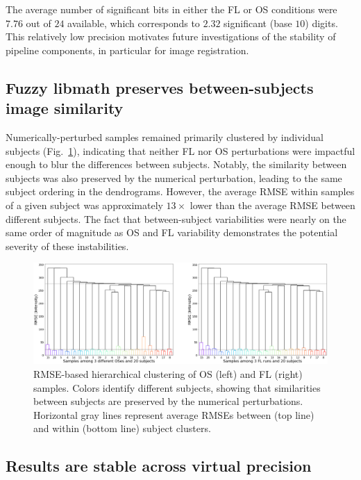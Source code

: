The average number of significant bits in either the FL or OS conditions
were $7.76$ out of $24$ available, which corresponds to $2.32$ significant (base $10$) digits.
This relatively low precision motivates future investigations of the
stability of pipeline components, in particular for image registration.

\subsection{Fuzzy libmath preserves between-subjects image similarity}

Numerically-perturbed samples remained primarily clustered by individual subjects
(Fig.~\ref{fig:clusters}), indicating that neither FL nor OS perturbations were
impactful enough to blur the differences between subjects.  Notably, the similarity between subjects was
also preserved by the numerical perturbation, leading to the same subject
ordering in the dendrograms. However, the average
RMSE within samples of a given subject was approximately $13 \times$
lower than the average RMSE between different subjects. The fact that between-subject variabilities
were nearly on the same order of magnitude as OS and FL variability demonstrates
the potential severity of these instabilities.

\begin{figure}
  \centering
  \includegraphics[width=\columnwidth]{chapters/chapter2/figures/Hclustering.png}
  \caption{RMSE-based hierarchical clustering of OS (left) and FL
    (right) samples. Colors identify different subjects, showing that
    similarities between subjects are preserved by the numerical perturbations. Horizontal gray lines
    represent average RMSEs between (top line) and within (bottom line) subject clusters.}
  \label{fig:clusters}
\end{figure}


\subsection{Results are stable across virtual precision}

